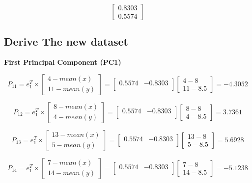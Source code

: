 \documentclass[
  letterpaper,
  DIV=11,
  numbers=noendperiod]{scrreprt}
\begin{document}
\[
\begin{bmatrix}
0.8303 \\ 0.5574
\end{bmatrix} 
\]

\hypertarget{derive-the-new-dataset}{%
\subsection{Derive The new dataset}\label{derive-the-new-dataset}}

\textbf{First Principal Component (PC1)}

\[
P_{11} = e_1^T \times 
\begin{bmatrix}
4-mean(x) \\ 11 -mean(y)
\end{bmatrix}
 = \begin{bmatrix}
0.5574 & -0.8303 \\
\end{bmatrix} 
\begin{bmatrix}
4-8 \\ 11-8.5
\end{bmatrix} =-4.3052 
\]

\[
P_{12} = e_1^T \times 
\begin{bmatrix}
8-mean(x) \\ 4 -mean(y)
\end{bmatrix}
 = \begin{bmatrix}
0.5574 & -0.8303 \\
\end{bmatrix} 
\begin{bmatrix}
8-8 \\ 4-8.5
\end{bmatrix} =3.7361 
\]

\[
P_{13} = e_1^T \times 
\begin{bmatrix}
13-mean(x) \\ 5 -mean(y)
\end{bmatrix}
 = \begin{bmatrix}
0.5574 & -0.8303 \\
\end{bmatrix} 
\begin{bmatrix}
13-8 \\ 5-8.5
\end{bmatrix}= 5.6928
\]

\[
P_{14}= e_1^T \times 
\begin{bmatrix}
7-mean(x) \\ 14 -mean(y)
\end{bmatrix}
 = \begin{bmatrix}
0.5574 & -0.8303 \\
\end{bmatrix} 
\begin{bmatrix}
7-8 \\ 14-8.5
\end{bmatrix} = -5.1238
\]
\end{document}
